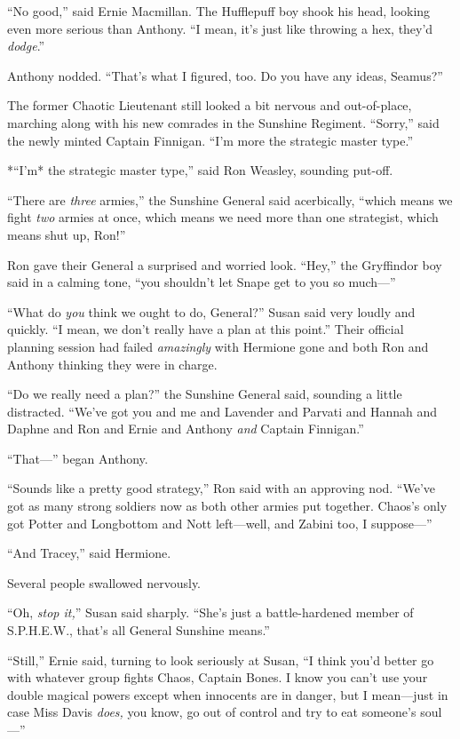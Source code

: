 ``No good,'' said Ernie Macmillan. The Hufflepuff boy shook his head,
looking even more serious than Anthony. ``I mean, it's just like
throwing a hex, they'd \emph{dodge}.''

Anthony nodded. ``That's what I figured, too. Do you have any ideas,
Seamus?''

The former Chaotic Lieutenant still looked a bit nervous and
out-of-place, marching along with his new comrades in the Sunshine
Regiment. ``Sorry,'' said the newly minted Captain Finnigan. ``I'm more
the strategic master type.''

*``I'm* the strategic master type,'' said Ron Weasley, sounding put-off.

``There are \emph{three} armies,'' the Sunshine General said
acerbically, ``which means we fight \emph{two} armies at once, which
means we need more than one strategist, which means shut up, Ron!''

Ron gave their General a surprised and worried look. ``Hey,'' the
Gryffindor boy said in a calming tone, ``you shouldn't let Snape get to
you so much---''

``What do \emph{you} think we ought to do, General?'' Susan said very
loudly and quickly. ``I mean, we don't really have a plan at this
point.'' Their official planning session had failed \emph{amazingly}
with Hermione gone and both Ron and Anthony thinking they were in
charge.

``Do we really need a plan?'' the Sunshine General said, sounding a
little distracted. ``We've got you and me and Lavender and Parvati and
Hannah and Daphne and Ron and Ernie and Anthony \emph{and} Captain
Finnigan.''

``That---'' began Anthony.

``Sounds like a pretty good strategy,'' Ron said with an approving nod.
``We've got as many strong soldiers now as both other armies put
together. Chaos's only got Potter and Longbottom and Nott left---well,
and Zabini too, I suppose---''

``And Tracey,'' said Hermione.

Several people swallowed nervously.

``Oh, \emph{stop it,}'' Susan said sharply. ``She's just a
battle-hardened member of S.P.H.E.W., that's all General Sunshine
means.''

``Still,'' Ernie said, turning to look seriously at Susan, ``I think
you'd better go with whatever group fights Chaos, Captain Bones. I know
you can't use your double magical powers except when innocents are in
danger, but I mean---just in case Miss Davis \emph{does,} you know, go
out of control and try to eat someone's soul---''

